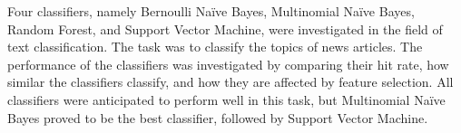 Four classifiers, namely Bernoulli Naïve Bayes, Multinomial Naïve Bayes, Random Forest, and Support Vector Machine, were investigated in the field of text classification. The task was to classify the topics of news articles. The performance of the classifiers was investigated by comparing their hit rate, how similar the classifiers classify, and how they are affected by feature selection. All classifiers were anticipated to perform well in this task, but Multinomial Naïve Bayes proved to be the best classifier, followed by Support Vector Machine.